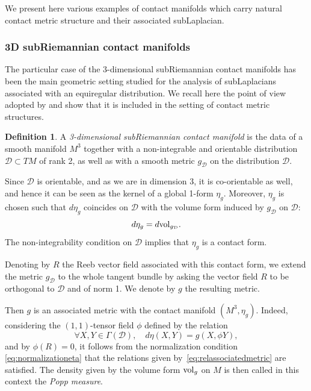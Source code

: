 \documentclass[12pt,a4paper]{amsart}
\theoremstyle{plain}
\theoremstyle{definition}
\newtheorem{definition}[theorem]{Definition}
\theoremstyle{remark}
\numberwithin{equation}{section}
\theoremstyle{definition}
\def \cD{\mathcal{D}}
\numberwithin{equation}{section}
\begin{document}
We present here various examples of contact manifolds which carry natural contact metric structure and their associated subLaplacian.

\subsubsection{3D subRiemannian contact manifolds} 
\label{subsubsect:3DsR}
The particular case of the 3-dimensional subRiemannian contact manifolds has been the main geometric setting studied for the analysis of subLaplacians associated with an equiregular distribution. We recall here the point of view adopted by \cite{CdVHT18} and show that it is included in the setting of contact metric structures.

\begin{definition}
 \label{def:3dsubRcontactmanifolds}
 A \emph{3-dimensional subRiemannian contact manifold} is the data of a smooth manifold $M^3$ together with a non-integrable and orientable distribution $\cD\subset TM$ of rank 2, as well as with 
 a smooth metric $g_\cD$ on the distribution $\cD$.
\end{definition}

Since $\cD$ is orientable, and as we are in dimension 3, it is co-orientable as well, and hence it can be seen as the kernel of a global 1-form $\eta_g$. Moreover, $\eta_g$ 
is chosen such that $d\eta_g$ coincides on $\cD$ with the volume form induced by $g_\cD$ on $\cD$:
\begin{equation}
    \label{eq:normalizationeta}
    d\eta_g = d{\rm vol}_{g_\cD}.
\end{equation}
The non-integrability condition on $\cD$ implies that $\eta_g$ is a contact form.

Denoting by $R$ the Reeb vector field associated with this contact form, we extend the metric $g_\cD$ to the whole tangent bundle by asking the vector field $R$ to be orthogonal to $\cD$ and of norm 1.
We denote by $g$ the resulting metric. 

Then $g$ is an associated metric with the contact manifold $(M^3,\eta_g)$. Indeed, considering the $(1,1)$-tensor field $\phi$ defined by the relation
\begin{equation*}
    \forall X,Y \in \Gamma(\cD), \quad d\eta(X,Y) = g(X,\phi Y),
\end{equation*}
and by $\phi(R) = 0$, it follows from the normalization condition \eqref{eq:normalizationeta} that the relations given by~\eqref{eq:relassociatedmetric} are satisfied.
The density given by the volume form ${\rm vol}_g$ on $M$ is then called in this context the \emph{Popp measure}.
\end{document}
